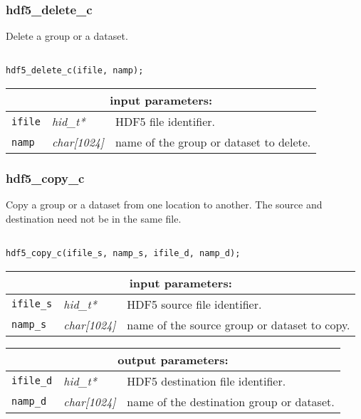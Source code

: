 \vskip 0.8cm

\subsubsection{hdf5\_delete\_c}

Delete a group or a dataset.

\begin{verbatim}

hdf5_delete_c(ifile, namp);
\end{verbatim}

\noindent
\begin{tabular}{|p{1.5cm}|p{2cm}|p{11cm}|}
\hline
\multicolumn{3}{|c|}{\bf input parameters:} \\
\hline
{\tt ifile} & {\it hid\_t*} & HDF5 file identifier. \\
\hline
{\tt namp} & {\it char[1024]} & name of the group or dataset to delete. \\
\hline
\end{tabular}

\vskip 0.8cm

\subsubsection{hdf5\_copy\_c}

Copy a group or a dataset from one location to another. The source and destination need not be in the same file.

\begin{verbatim}

hdf5_copy_c(ifile_s, namp_s, ifile_d, namp_d);
\end{verbatim}

\noindent
\begin{tabular}{|p{1.5cm}|p{2cm}|p{11cm}|}
\hline
\multicolumn{3}{|c|}{\bf input parameters:} \\
\hline
{\tt ifile\_s} & {\it hid\_t*} & HDF5 source file identifier. \\
\hline
{\tt namp\_s} & {\it char[1024]} & name of the source group or dataset to copy. \\
\hline
\end{tabular}

\vskip 0.8cm

\noindent
\begin{tabular}{|p{1.5cm}|p{2cm}|p{11cm}|}
\hline
\multicolumn{3}{|c|}{\bf output parameters:} \\
\hline
{\tt ifile\_d} & {\it hid\_t*} & HDF5 destination file identifier. \\
\hline
{\tt namp\_d} & {\it char[1024]} & name of the destination group or dataset. \\
\hline
\end{tabular}


